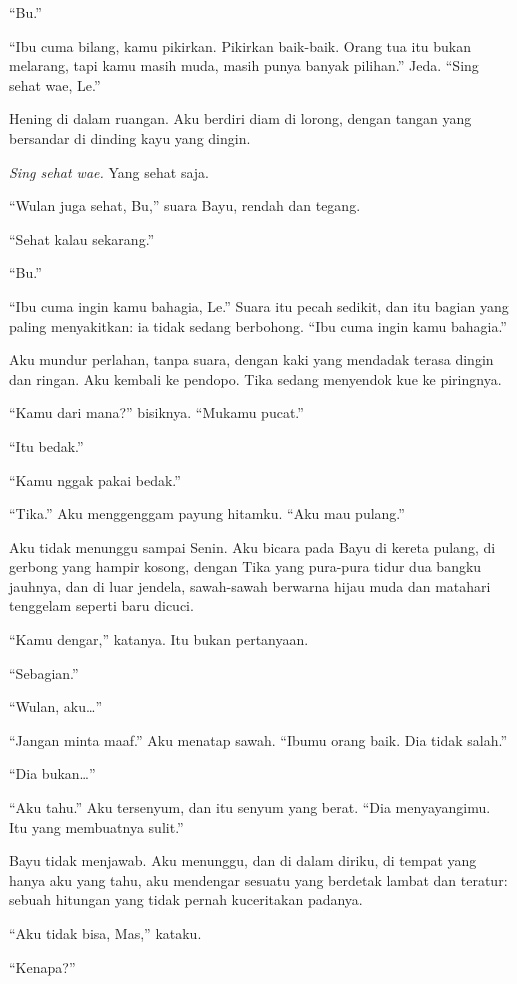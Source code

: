 \documentclass[11pt,twoside,openany]{book}
\makeatletter
\newcommand{\scenebreak}{\par\vspace{0.9em}{\centering\textsc{*\hspace{0.7em}*\hspace{0.7em}*}\par}\vspace{0.9em}\@afterindentfalse\@afterheading}
\makeatother
\begin{document}
``Bu.''

``Ibu cuma bilang, kamu pikirkan. Pikirkan baik-baik. Orang tua itu bukan melarang, tapi kamu masih muda, masih punya banyak pilihan.'' Jeda. ``Sing sehat wae, Le.''

Hening di dalam ruangan. Aku berdiri diam di lorong, dengan tangan yang bersandar di dinding kayu yang dingin.

\emph{Sing sehat wae.} Yang sehat saja.

``Wulan juga sehat, Bu,'' suara Bayu, rendah dan tegang.

``Sehat kalau sekarang.''

``Bu.''

``Ibu cuma ingin kamu bahagia, Le.'' Suara itu pecah sedikit, dan itu bagian yang paling menyakitkan: ia tidak sedang berbohong. ``Ibu cuma ingin kamu bahagia.''

Aku mundur perlahan, tanpa suara, dengan kaki yang mendadak terasa dingin dan ringan. Aku kembali ke pendopo. Tika sedang menyendok kue ke piringnya.

``Kamu dari mana?'' bisiknya. ``Mukamu pucat.''

``Itu bedak.''

``Kamu nggak pakai bedak.''

``Tika.'' Aku menggenggam payung hitamku. ``Aku mau pulang.''

\scenebreak
Aku tidak menunggu sampai Senin. Aku bicara pada Bayu di kereta pulang, di gerbong yang hampir kosong, dengan Tika yang pura-pura tidur dua bangku jauhnya, dan di luar jendela, sawah-sawah berwarna hijau muda dan matahari tenggelam seperti baru dicuci.

``Kamu dengar,'' katanya. Itu bukan pertanyaan.

``Sebagian.''

``Wulan, aku\ldots{}''

``Jangan minta maaf.'' Aku menatap sawah. ``Ibumu orang baik. Dia tidak salah.''

``Dia bukan\ldots{}''

``Aku tahu.'' Aku tersenyum, dan itu senyum yang berat. ``Dia menyayangimu. Itu yang membuatnya sulit.''

Bayu tidak menjawab. Aku menunggu, dan di dalam diriku, di tempat yang hanya aku yang tahu, aku mendengar sesuatu yang berdetak lambat dan teratur: sebuah hitungan yang tidak pernah kuceritakan padanya.

``Aku tidak bisa, Mas,'' kataku.

``Kenapa?''
\end{document}
